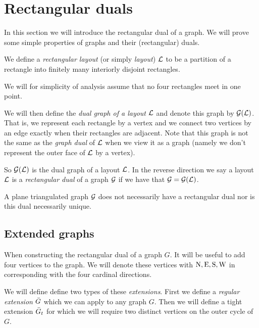 
\section{Rectangular duals}
\newcommand{\G}{\scr G}
\renewcommand{\L}{\scr L}

In this section we will introduce the rectangular dual of a graph. We will prove some simple properties of graphs and their (rectangular) duals.

We define a \emph{rectangular layout} (or simply \emph{layout}) $\L$ to be a partition of a rectangle into finitely many interiorly disjoint rectangles.

We will for simplicity of analysis assume that no four rectangles meet in one point. 

We will then define the \emph{dual graph of a layout} $\L$ and denote this graph by $\G(\L)$. That is, we represent each rectangle by a vertex and we connect two vertices by an edge exactly when their rectangles are adjacent. Note that this graph is not the same as the \emph{graph dual} of $\L$ when we view it as a graph (namely we don't represent the outer face of $\L$ by a vertex).

So $\G(\L)$ is the dual graph of a layout $\L$. In the reverse direction we say a layout $\L$ is a \emph{rectangular dual} of a graph $\G$ if we have that $\G = \G (\L)$.

A plane triangulated graph $\G$ does not necessarily have a rectangular dual nor is this dual necessarily unique.


\subsection{Extended graphs}
When constructing the rectangular dual of a graph $G$. It will be useful to add four vertices to the graph. We will denote these vertices with $\mathrm{N}, \mathrm{E}, \mathrm{S}, \mathrm{W}$ in corresponding with the four cardinal directions.

We will define define two types of these \emph{extensions}. First we define a \emph{regular extension} $\bar{G}$ which we can apply to any graph $G$. Then we will define a tight extension $\bar{G}_t$ for which we will require two distinct vertices on the outer cycle of $G$.

